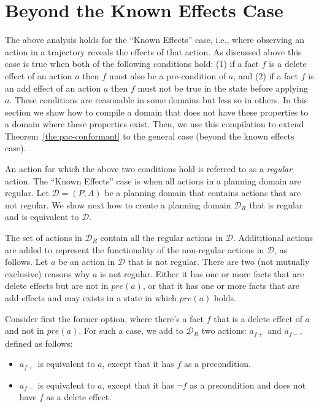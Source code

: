 \section{Beyond the Known Effects Case}
The above analysis holds for the ``Known Effects'' case, i.e., where observing an action in a trajectory reveals the effects of that action. As discussed above this case is true when both of the following conditions hold:
(1) if a fact $f$ is a delete effect of an action $a$ then 
$f$ must also be a pre-condition of $a$, and
(2) if a fact $f$ is an add effect of an action $a$ then 
$f$ must not be true in the state before applying $a$. 
These conditions are reasonable in some domains but less so in others. In this section we show how to compile a domain that does not have these properties to a domain where these properties exist.
Then, we use this compilation to extend Theorem~\ref{the:pac-conformant} to the general case (beyond the known effects case). 


An action for which the above two conditions hold is referred to as a {\em regular} action. The ``Known Effects'' case is when all actions in a planning domain are regular. 
Let $\mathcal{D}=(P,A)$ be a planning domain that contains actions that are not regular. We show next how to create a planning domain $\mathcal{D}_R$ that is regular and is equivalent to $\mathcal{D}$. 

The set of actions in $\mathcal{D}_R$ contain all the regular actions in $\mathcal{D}$. Addititional actions are added to represent the functionality of the non-regular actions in $\mathcal{D}$, as follows. Let $a$ be an action in $\mathcal{D}$ that is not regular. There are two (not mutually exclusive) reasons why $a$ is not regular. Either it has one or more facts that are delete effects but are not in $pre(a)$, or that it has one or more facts that are add effects and may exists in a state in which $pre(a)$ holds. 

Consider first the former option, where there's a fact $f$ that is a delete effect of $a$ and not in $pre(a)$. For such a case, we add to $\mathcal{D}_R$ two actions: $a_{f+}$ and $a_{f-}$, defined as follows:
\begin{itemize}
	\item $a_{f+}$ is equivalent to $a$, except that it has $f$ as a precondition. 
	\item $a_{f-}$ is equivalent to $a$, except that it has $\neg f$ as a precondition and does not have $f$ as a delete effect.
\end{itemize}

